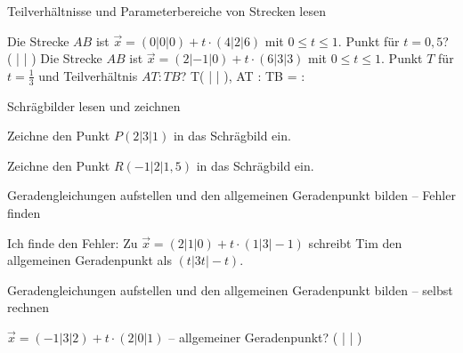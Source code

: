 \begin{aufgabe}{Teilverhältnisse und Parameterbereiche von Strecken lesen}
\begin{teile}
\teil Die Strecke $AB$ ist $\vec{x} = (0|0|0) + t \cdot (4|2|6)$ mit $0 \le t \le 1$. Punkt für $t = 0{,}5$? ( \leerfeld | \leerfeld | \leerfeld )
\teil Die Strecke $AB$ ist $\vec{x} = (2|-1|0) + t \cdot (6|3|3)$ mit $0 \le t \le 1$. Punkt $T$ für $t = \frac{1}{3}$ und Teilverhältnis $AT : TB$? T( \leerfeld | \leerfeld | \leerfeld ), AT : TB = \leerfeld : \leerfeld
\end{teile}
\end{aufgabe}

\begin{aufgabe}{Schrägbilder lesen und zeichnen}
\begin{teile}
\teil Zeichne den Punkt $P(2|3|1)$ in das Schrägbild ein.

\begin{ksys3}[xyz,x1min=0,x1max=4,x2min=0,x2max=4,x3min=0,x3max=3] \end{ksys3}
\teil Zeichne den Punkt $R(-1|2|1{,}5)$ in das Schrägbild ein.

\begin{ksys3}[xyz,x1min=-2,x1max=3,x2min=0,x2max=4,x3min=0,x3max=3] \end{ksys3}
\end{teile}
\end{aufgabe}

\begin{aufgabe}{Geradengleichungen aufstellen und den allgemeinen Geradenpunkt bilden – Fehler finden}
\begin{teile}
\teil Ich finde den Fehler: Zu $\vec{x} = (2|1|0) + t \cdot (1|3|-1)$ schreibt Tim den allgemeinen Geradenpunkt als $(t|3t|-t)$.
\end{teile}
\end{aufgabe}

\begin{aufgabe}{Geradengleichungen aufstellen und den allgemeinen Geradenpunkt bilden – selbst rechnen}
\begin{teile}
\teil $\vec{x} = (-1|3|2) + t \cdot (2|0|1)$ – allgemeiner Geradenpunkt? ( \leerfeld | \leerfeld | \leerfeld )
\end{teile}
\end{aufgabe}
